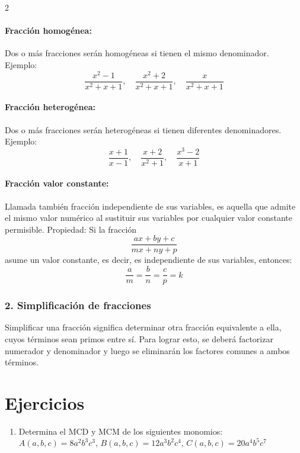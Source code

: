 \documentclass[10pt]{article}
\begin{document}
\begin{multicols}{2}
	\paragraph{Fracción homogénea:}
	Dos o más fracciones serán homogéneas si tienen el mismo denominador. Ejemplo:
	\[
	\frac{x^2 - 1}{x^2 + x + 1}, \quad \frac{x^2 + 2}{x^2 + x + 1}, \quad \frac{x}{x^2 + x + 1}
	\]

	\paragraph{Fracción heterogénea:}
	Dos o más fracciones serán heterogéneas si tienen diferentes denominadores. Ejemplo:
	\[
	\frac{x + 1}{x - 1}, \quad \frac{x + 2}{x^2 + 1}, \quad \frac{x^3 - 2}{x + 1}
	\]


	\paragraph{Fracción valor constante:}
	Llamada también fracción independiente de sus variables, es aquella que admite el mismo valor numérico al sustituir sus variables por cualquier valor constante permisible. Propiedad: Si la fracción
	\[
	\frac{ax + by + c}{mx + ny + p}
	\]
	asume un valor constante, es decir, es independiente de sus variables, entonces:
	\[
	\frac{a}{m} = \frac{b}{n} = \frac{c}{p} = k
	\]

	\subsubsection*{2. Simplificación de fracciones}
	Simplificar una fracción significa determinar otra fracción equivalente a ella, cuyos términos sean primos entre sí. Para lograr esto, se deberá factorizar numerador y denominador y luego se eliminarán los factores comunes a ambos términos.


	\section*{Ejercicios}
		\begin{enumerate}[label=\textbf{\arabic*.}, itemsep=0.4cm]
			\item Determina el MCD y MCM de los siguientes monomios: \\
			$A(a, b, c) = 8a^2 b^3 c^3$, $B(a, b, c) = 12a^3 b^2 c^4$, $C(a, b, c) = 20a^4 b^5 c^7$ \\



\end{enumerate}
\end{multicols}
\end{document}
